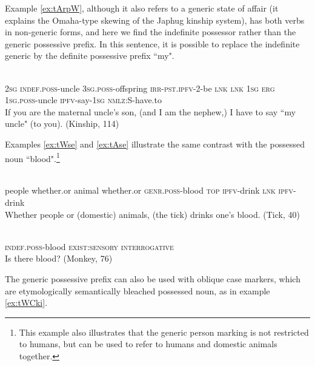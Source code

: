 Example \ref{ex:tArpW}, although it also refers to a generic state of affair (it explains the Omaha-type skewing of the Japhug kinship system), has both verbs in non-generic forms, and here we find the indefinite possessor  rather than the generic  possessive prefix. In this sentence, it is possible to replace the indefinite generic  by the definite possessive prefix  ``my".

\begin{exe}
\ex  \label{ex:tArpW}
\gll
{} 	 	 	 	 	 	 	 	 	 	  \\
\textsc{2sg} \textsc{indef.poss}-uncle \textsc{3sg.poss}-offspring \textsc{irr-pst.ipfv}-2-be \textsc{lnk} \textsc{lnk} \textsc{1sg} \textsc{erg}  \textsc{1sg.poss}-uncle \textsc{ipfv}-say-\textsc{1sg} \textsc{nmlz:S}-have.to  \\
\glt If you are the maternal uncle's son, (and I am the nephew,) I have to say ``my uncle" (to you).  (Kinship, 114)
\end{exe}

Examples \ref{ex:tWse} and \ref{ex:tAse} illustrate the same contrast with the possessed noun  ``blood".\footnote{This example also illustrates that the generic person marking is not restricted to humans, but can be used to refer to humans and domestic animals together.  }

\begin{exe}
\ex  \label{ex:tWse}
\gll
{} 	 	 	 	 	 	 	 	 \\
people whether.or animal whether.or \textsc{genr.poss}-blood \textsc{top} \textsc{ipfv}-drink \textsc{lnk} \textsc{ipfv}-drink \\
\glt Whether people or (domestic) animals, (the tick) drinks one's blood. (Tick, 40)
\end{exe}

\begin{exe}
\ex  \label{ex:tAse}
\gll
{} 	 	 \\
\textsc{indef.poss}-blood \textsc{exist:sensory} \textsc{interrogative} \\
\glt Is there blood? (Monkey, 76)
\end{exe}

The generic possessive prefix can also be used with oblique case markers, which are etymologically semantically bleached possessed noun, as in example \ref{ex:tWCki}.

